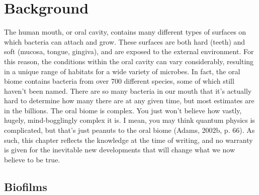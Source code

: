 \documentclass[
  letterpaper,
]{book}
\begin{document}

\hypertarget{chap-background}{%
\chapter{Background}\label{chap-background}}

The human mouth, or oral cavity, contains many different types of
surfaces on which bacteria can attach and grow. These surfaces are both
hard (teeth) and soft (mucosa, tongue, gingiva), and are exposed to the
external environment. For this reason, the conditions within the oral
cavity can vary considerably, resulting in a unique range of habitats
for a wide variety of microbes. In fact, the oral biome contains
bacteria from over 700 different species, some of which still haven't
been named. There are so many bacteria in our mouth that it's actually
hard to determine how many there are at any given time, but most
estimates are in the billions. The oral biome is complex. You just won't
believe how vastly, hugely, mind-bogglingly complex it is. I mean, you
may think quantum physics is complicated, but that's just peanuts to the
oral biome (Adams, 2002b, p. 66). As such, this chapter reflects the
knowledge at the time of writing, and no warranty is given for the
inevitable new developments that will change what we now believe to be
true.

\hypertarget{biofilms}{%
\section{Biofilms}\label{biofilms}}
\end{document}
